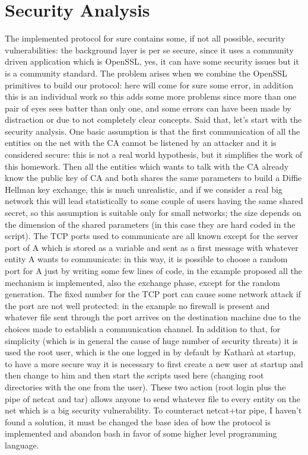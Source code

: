 \documentclass{article}
\begin{document}
\section{Security Analysis}
\label{sec:secAn}

The implemented protocol for sure contains some, if not all possible, security vulnerabilities: the background layer is per se secure, since it uses a community driven application which is OpenSSL, yes, it can have some security issues but it is a community standard. The problem arises when we combine the OpenSSL primitives to build our protocol: here will come for sure some error, in addition this is an individual work so this adds some more problems since more than one pair of eyes sees batter than only one, and some errors can have been made by distraction or due to not completely clear concepts. Said that, let's start with the security analysis. \newline
One basic assumption is that the first communication of all the entities on the net with the CA cannot be listened by an attacker and it is considered secure: this is not a real world hypothesis, but it simplifies the work of this homework. Then all the entities which wants to talk with the CA already know the public key of CA and both shares the same parameters to build a Diffie Hellman key exchange, this is much unrealistic, and if we consider a real big network this will lead statistically to some couple of users having the same shared secret, so this assumption is suitable only for small networks; the size depends on the dimension of the shared parameters (in this case they are hard coded in the script).\newline
The TCP ports used to communicate are all known except for the server port of A which is stored as a variable and sent as a first message with whatever entity A wants to communicate: in this way, it is possible to choose a random port for A just by writing some few lines of code, in the example proposed all the mechanism is implemented, also the exchange phase, except for the random generation. The fixed number for the TCP port can cause some network attack if the port are not well protected: in the example no firewall is present and whatever file sent through the port arrives on the destination machine due to the choices made to establish a communication channel. In addition to that, for simplicity (which is in general the cause of huge number of security threats) it is used the root user, which is the one logged in by default by Katharà at startup, to have a more secure way it is necessary to first create a new user at startup and then change to him and then start the scripts used here (changing root directories with the one from the user). These two action (root login plus the pipe of netcat and tar) allows anyone to send whatever file to every entity on the net which is a big security vulnerability. To counteract netcat+tar pipe, I haven't found a solution, it must be changed the base idea of how the protocol is implemented and abandon bash in favor of some higher level programming language.\newline
\end{document}

